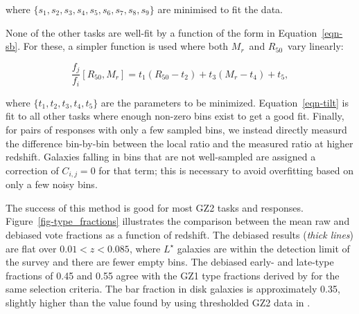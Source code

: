 \documentclass[useAMS,usenatbib]{mn2e}
\newcommand{\mr}{$M_r$}
\newcommand{\rfifty}{$R_{50}$}
\begin{document}
\noindent where $\{s_1,s_2,s_3,s_4,s_5,s_6,s_7,s_8,s_9\}$ are minimised to fit the data. %

None of the other tasks are well-fit by a function of the form in Equation~\ref{eqn-sb}. For these, a simpler function is used where both \mr~and \rfifty~vary linearly:

\begin{equation}
\frac{f_j}{f_i}[R_{50},M_r] = t_1(R_{50} - t_2) + t_3(M_r - t_4) + t_5,
\label{eqn-tilt}
\end{equation}

\noindent where $\{t_1,t_2,t_3,t_4,t_5\}$ are the parameters to be minimized. Equation~\ref{eqn-tilt} is fit to all other tasks where enough non-zero bins exist to get a good fit. Finally, for pairs of responses with only a few sampled bins, we instead directly measurd the difference bin-by-bin between the local ratio and the measured ratio at higher redshift. Galaxies falling in bins that are not well-sampled are assigned a correction of $C_{i,j}=0$ for that term; this is necessary to avoid overfitting based on only a few noisy bins. 



The success of this method is good for most GZ2 tasks and responses. Figure~\ref{fig-type_fractions} illustrates the comparison between the mean raw and debiased vote fractions as a function of redshift. The debiased results ({\it thick lines}) are flat over $0.01<z<0.085$, where $L^\star$ galaxies \citep[$M_r\sim-20.44$;][]{bla03a} are within the detection limit of the survey and there are fewer empty bins. The debiased early- and late-type fractions of 0.45 and 0.55 agree with the GZ1 type fractions derived by \citet{bam09} for the same selection criteria. The bar fraction in disk galaxies is approximately 0.35, slightly higher than the value found by using thresholded GZ2 data in \citet{mas11c}.
\end{document}
